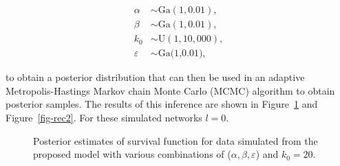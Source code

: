 \documentclass[
  sn-basic,
]{sn-jnl}
\theoremstyle{plain}
\theoremstyle{remark}
\begin{document}
\begin{align*}
\alpha&\sim \text{Ga}(1,0.01),\\
\beta &\sim  \text{Ga}(1,0.01),\\
k_0 &\sim \text{U}(1,10,000),\\
\varepsilon &\sim \text{Ga(1,0.01)},
\end{align*}

to obtain a posterior distribution that can then be used in an adaptive
Metropolis-Hastings Markov chain Monte Carlo (MCMC) algorithm to obtain
posterior samples. The results of this inference are shown in
Figure~\ref{fig-rec1} and Figure~\ref{fig-rec2}. For these simulated
networks \(l=0\).

\begin{figure}[H]


\caption{\label{fig-rec1}Posterior estimates of survival function for
data simulated from the proposed model with various combinations of
(\(\alpha,\beta,\varepsilon\)) and \(k_0=20\).}

\end{figure}%
\end{document}
